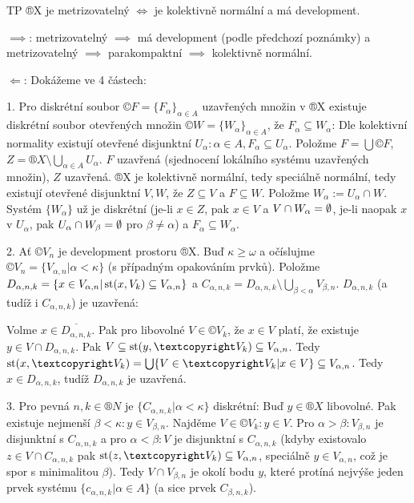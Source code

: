\documentclass[12pt]{article}                   %
\begin{document}
    \begin{veta}[Bing]
        TP ®X je metrizovatelný $\Leftrightarrow$ je kolektivně normální a má development.

        \begin{dukazin}
            $\implies$: metrizovatelný $\implies$ má development (podle předchozí poznámky) a metrizovatelný $\implies$ parakompaktní $\implies$ kolektivně normální.


            $\Leftarrow$: Dokážeme ve 4 částech:

            1. Pro diskrétní soubor $©F = \{F_\alpha\}_{\alpha \in A}$ uzavřených množin v ®X existuje diskrétní soubor otevřených množin $©W = \{W_\alpha\}_{\alpha \in A}$, že $F_\alpha \subseteq W_\alpha$: Dle kolektivní normality existují otevřené disjunktní $U_\alpha: \alpha \in A, F_\alpha \subseteq U_\alpha$. Položme $F = \bigcup ©F$, $Z = ®X \setminus \bigcup_{\alpha \in A} U_\alpha$. $F$ uzavřená (sjednocení lokálního systému uzavřených množin), $Z$ uzavřená. ®X je kolektivně normální, tedy speciálně normální, tedy existují otevřené disjunktní $V, W$, že $Z \subseteq V$ a $F \subseteq W$. Položme $W_\alpha := U_\alpha \cap W$. Systém $\{W_\alpha\}$ už je diskrétní (je-li $x \in Z$, pak $x \in V$ a $V \cap W_\alpha = \emptyset$, je-li naopak $x$ v $U_\alpha$, pak $U_\alpha \cap W_\beta = \emptyset$ pro $\beta ≠ \alpha$) a $F_\alpha \subseteq W_\alpha$.

            2. Ať $©V_n$ je development prostoru ®X. Buď $\kappa ≥ \omega$ a očíslujme $©V_n = \{V_{\alpha, n} | \alpha < \kappa\}$ (s případným opakováním prvků). Položme $D_{\alpha, n, k} = \{x \in V_{\alpha, n} | \operatorname{st}(x, V_k) \subseteq V_{\alpha, n}\}$ a $C_{\alpha, n, k} = D_{\alpha, n, k} \setminus \bigcup_{\beta < \alpha} V_{\beta, n}$. $D_{\alpha, n, k}$ (a tudíž i $C_{\alpha, n, k}$) je uzavřená:

                Volme $x \in \overline{D_{\alpha, n, k}}$. Pak pro libovolné $V \in ©V_k$, že $x \in V$ platí, že existuje $y \in V \cap D_{\alpha, n, k}$. Pak $V \subseteq \st(y, ©V_k) \subseteq V_{\alpha, n}$. Tedy $\st(x, ©V_k) = \bigcup\{V \in ©V_k | x \in V\} \subseteq V_{\alpha, n}$. Tedy $x \in D_{\alpha, n, k}$, tudíž $D_{\alpha, n, k}$ je uzavřená.

            3. Pro pevná $n, k \in ®N$ je $\{C_{\alpha, n, k} | \alpha < \kappa\}$ diskrétní: Buď $y \in ®X$ libovolné. Pak existuje nejmenší $\beta < \kappa: y \in V_{\beta, n}$. Najděme $V \in ©V_k: y \in V$. Pro $\alpha > \beta: V_{\beta, n}$ je disjunktní s $C_{\alpha, n, k}$ a pro $\alpha < \beta: V$ je disjunktní s $C_{\alpha, n, k}$ (kdyby existovalo $z \in V \cap C_{\alpha, n, k}$ pak $\st(z, ©V_k) \subseteq V_{\alpha, n}$, speciálně $y \in V_{\alpha, n}$, což je spor s minimalitou $\beta$). Tedy $V \cap V_{\beta, n}$ je okolí bodu $y$, které protíná nejvýše jeden prvek systému $\{c_{\alpha, n, k} | \alpha \in A\}$ (a sice prvek $C_{\beta, n, k}$).


\end{dukazin}
\end{veta}
\end{document}
